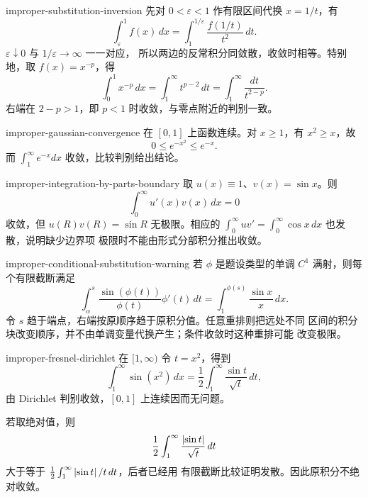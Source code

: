 \begin{solution}{improper-substitution-inversion}
先对 \(0<\varepsilon<1\) 作有限区间代换 \(x=1/t\)，有
\[
 \int_\varepsilon^1 f(x)\,dx
 =\int_1^{1/\varepsilon}\frac{f(1/t)}{t^2}\,dt.
\]
\(\varepsilon\downarrow0\) 与 \(1/\varepsilon\to\infty\) 一一对应，
所以两边的反常积分同敛散，收敛时相等。特别地，取 \(f(x)=x^{-p}\)，得
\[
 \int_0^1 x^{-p}\,dx
 =\int_1^\infty t^{p-2}\,dt
 =\int_1^\infty\frac{dt}{t^{2-p}}.
\]
右端在 \(2-p>1\)，即 \(p<1\) 时收敛，与零点附近的判别一致。
\end{solution}

\begin{solution}{improper-gaussian-convergence}
在 \([0,1]\) 上函数连续。对 \(x\ge1\)，有 \(x^2\ge x\)，故
\[
 0\le e^{-x^2}\le e^{-x}.
\]
而 \(\int_1^\infty e^{-x}dx\) 收敛，比较判别给出结论。
\end{solution}

\begin{solution}{improper-integration-by-parts-boundary}
取 \(u(x)\equiv1\)、\(v(x)=\sin x\)。则
\[
 \int_0^\infty u'(x)v(x)\,dx=0
\]
收敛，但 \(u(R)v(R)=\sin R\) 无极限。相应的
\(\int_0^\infty uv'=\int_0^\infty\cos x\,dx\) 也发散，说明缺少边界项
极限时不能由形式分部积分推出收敛。
\end{solution}

\begin{solution}{improper-conditional-substitution-warning}
若 \(\phi\) 是题设类型的单调 \(C^1\) 满射，则每个有限截断满足
\[
 \int_{\alpha}^{s}
 \frac{\sin(\phi(t))}{\phi(t)}\phi'(t)\,dt
 =\int_1^{\phi(s)}\frac{\sin x}{x}\,dx.
\]
令 \(s\) 趋于端点，右端按原顺序趋于原积分值。任意重排则把远处不同
区间的积分块改变顺序，并不由单调变量代换产生；条件收敛时这种重排可能
改变极限。
\end{solution}

\begin{solution}{improper-fresnel-dirichlet}
在 \([1,\infty)\) 令 \(t=x^2\)，得到
\[
 \int_1^\infty\sin(x^2)\,dx
 =\frac12\int_1^\infty\frac{\sin t}{\sqrt t}\,dt,
\]
由 Dirichlet 判别收敛，\([0,1]\) 上连续因而无问题。

若取绝对值，则
\[
 \frac12\int_1^\infty\frac{\left|\sin t\right|}{\sqrt t}\,dt
\]
大于等于 \(\frac12\int_1^\infty\left|\sin t\right|/t\,dt\)，后者已经用
有限截断比较证明发散。因此原积分不绝对收敛。
\end{solution}
